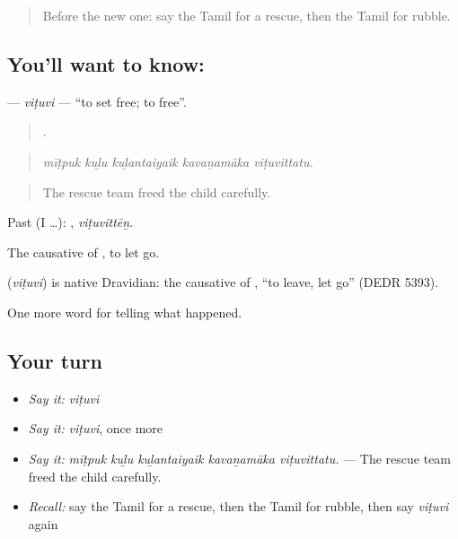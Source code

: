 \label{lesson:TA-C301-vituvi}



\begin{quote}
Before the new one: say the Tamil for a rescue, then the Tamil for rubble.
\end{quote}

\subsection*{You'll want to know: }
\textbf{} — \emph{viṭuvi} — \textquotedblleft{}to set free; to free\textquotedblright{}.

\begin{quote}
    .
\end{quote}

\begin{quote}
\emph{mīṭpuk kuḻu kuḻantaiyaik kavaṉamāka viṭuvittatu.}
\end{quote}

\begin{quote}
The rescue team freed the child carefully.
\end{quote}

Past (I …): , \emph{viṭuvittēṉ}.

The causative of , to let go.

\begin{cousinweb}
\textbf{} (\emph{viṭuvi}) is native Dravidian: the causative of , \textquotedblleft{}to leave, let go\textquotedblright{} (DEDR 5393).
\end{cousinweb}

\begin{grammarlens}[title={What you've built}]
One more word for telling what happened.
\end{grammarlens}

\subsection*{Your turn}
\begin{itemize}
\raggedright
  \item \emph{Say it:} \emph{viṭuvi}
  \item \emph{Say it:} \emph{viṭuvi}, once more
  \item \emph{Say it:} \emph{mīṭpuk kuḻu kuḻantaiyaik kavaṉamāka viṭuvittatu.} — The rescue team freed the child carefully.
  \item \emph{Recall:} say the Tamil for a rescue, then the Tamil for rubble, then say \emph{viṭuvi} again
\end{itemize}


